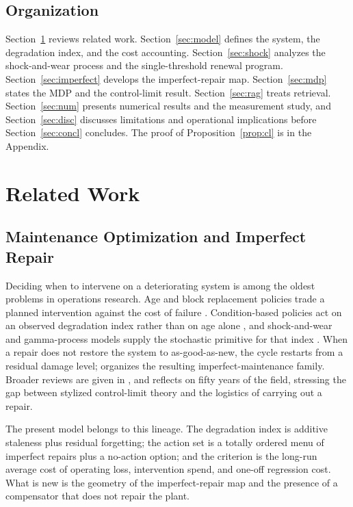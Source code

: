 \documentclass[journal]{IEEEtran}
\begin{document}
\subsection{Organization}
Section~\ref{sec:related} reviews related work. Section~\ref{sec:model} defines the system, the degradation index, and the cost accounting. Section~\ref{sec:shock} analyzes the shock-and-wear process and the single-threshold renewal program. Section~\ref{sec:imperfect} develops the imperfect-repair map. Section~\ref{sec:mdp} states the MDP and the control-limit result. Section~\ref{sec:rag} treats retrieval. Section~\ref{sec:num} presents numerical results and the measurement study, and Section~\ref{sec:disc} discusses limitations and operational implications before Section~\ref{sec:concl} concludes. The proof of Proposition~\ref{prop:cl} is in the Appendix.

\section{Related Work}\label{sec:related}
\subsection{Maintenance Optimization and Imperfect Repair}
Deciding when to intervene on a deteriorating system is among the oldest problems in operations research. Age and block replacement policies trade a planned intervention against the cost of failure \cite{barlow1965}. Condition-based policies act on an observed degradation index rather than on age alone \cite{jardine2006,wang2002}, and shock-and-wear and gamma-process models supply the stochastic primitive for that index \cite{vannoortwijk2009}. When a repair does not restore the system to as-good-as-new, the cycle restarts from a residual damage level; \cite{pham1996} organizes the resulting imperfect-maintenance family. Broader reviews are given in \cite{dekker1996,dejonge2020}, and \cite{arts2025} reflects on fifty years of the field, stressing the gap between stylized control-limit theory and the logistics of carrying out a repair.

The present model belongs to this lineage. The degradation index is additive staleness plus residual forgetting; the action set is a totally ordered menu of imperfect repairs plus a no-action option; and the criterion is the long-run average cost of operating loss, intervention spend, and one-off regression cost. What is new is the geometry of the imperfect-repair map and the presence of a compensator that does not repair the plant.
\end{document}
